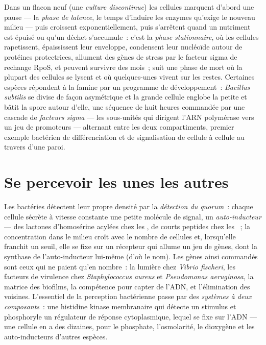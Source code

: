 \begin{definition}\label{def:b3:bacteriology:phases}
Dans un flacon neuf (une \emph{culture discontinue}) les cellules
marquent d'abord une pause --- la \emph{phase de latence}, le temps
d'induire les enzymes qu'exige le nouveau milieu --- puis croissent
exponentiellement, puis s'arrêtent quand un nutriment est épuisé ou
qu'un déchet s'accumule~: c'est la \emph{phase stationnaire}, où les
cellules rapetissent, épaississent leur enveloppe, condensent leur
nucléoïde autour de protéines protectrices, allument des gènes de
stress par le facteur sigma de rechange RpoS, et peuvent survivre des
mois~; suit une phase de mort où la plupart des cellules se lysent et
où quelques-unes vivent sur les restes. Certaines espèces répondent à
la famine par un programme de développement~: \emph{Bacillus subtilis}
se divise de façon asymétrique et la grande cellule englobe la petite
et bâtit la spore autour d'elle, une séquence de huit heures commandée
par une cascade de \emph{facteurs sigma} --- les sous-unités qui
dirigent l'ARN polymérase vers un jeu de promoteurs --- alternant entre
les deux compartiments, premier exemple bactérien de différenciation et
de signalisation de cellule à cellule au travers d'une paroi.
\end{definition}

\section{Se percevoir les unes les autres}

\begin{definition}\label{def:b3:bacteriology:quorum}
Les bactéries détectent leur propre densité par la \emph{détection du
quorum}~: chaque cellule sécrète à vitesse constante une petite
molécule de signal, un \emph{auto-inducteur} --- des lactones
d'homosérine acylées chez les , de courts peptides chez
les ~; la concentration dans le milieu croît avec le
nombre de cellules et, lorsqu'elle franchit un seuil, elle se fixe sur
un récepteur qui allume un jeu de gènes, dont la synthase de
l'auto-inducteur lui-même (d'où le nom). Les gènes ainsi commandés sont
ceux qui ne paient qu'en nombre~: la lumière chez \emph{Vibrio
fischeri}, les facteurs de virulence chez \emph{Staphylococcus aureus}
et \emph{Pseudomonas aeruginosa}, la matrice des biofilms, la
compétence pour capter de l'ADN, et l'élimination des voisines.
L'essentiel de la perception bactérienne passe par des \emph{systèmes à
deux composants}~: une histidine kinase membranaire qui détecte un
stimulus et phosphoryle un régulateur de réponse cytoplasmique, lequel
se fixe sur l'ADN --- une cellule en a des dizaines, pour le phosphate,
l'osmolarité, le dioxygène et les auto-inducteurs d'autres espèces.
\end{definition}

